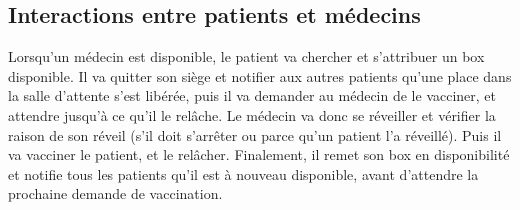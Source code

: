 \documentclass[a4paper]{article}
\begin{document}
\subsection{Interactions entre patients et médecins}


    Lorsqu'un médecin est disponible, le patient va chercher et s'attribuer un box disponible. Il va quitter son siège et notifier aux autres patients qu'une place dans la salle d'attente s'est libérée, puis il va demander au médecin de le vacciner, et attendre jusqu'à ce qu'il le relâche. Le médecin va donc se réveiller et vérifier la raison de son réveil (s'il doit s'arrêter ou parce qu'un patient l'a réveillé). Puis il va vacciner le patient, et le relâcher. Finalement, il remet son box en disponibilité et notifie tous les patients qu'il est à nouveau disponible, avant d'attendre la prochaine demande de vaccination.
\end{document}
